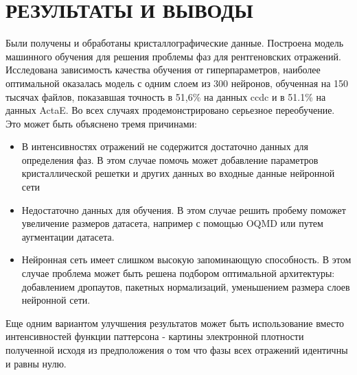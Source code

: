\documentclass{article}
\begin{document}





\newpage
\section{РЕЗУЛЬТАТЫ И ВЫВОДЫ}

Были получены и обработаны кристаллографические данные. Построена модель машинного обучения для решения проблемы фаз для рентгеновских отражений. Исследована зависимость качества обучения от гиперпараметров, наиболее оптимальной оказалась модель с одним слоем из 300 нейронов, обученная на 150 тысячах файлов, показавшая точность в 51,6\% на данных ccdc и в 51.1\% на данных ActaE. Во всех случаях продемонстрировано серьезное переобучение. Это может быть объяснено тремя причинами:
\begin{itemize}
\item В интенсивностях отражений не содержится достаточно данных для определения фаз. В этом случае помочь может добавление параметров кристаллической решетки и других данных во входные данные нейронной сети
\item Недостаточно данных для обучения. В этом случае решить пробему поможет увеличение размеров датасета, например с помощью OQMD или путем аугментации датасета.
\item Нейронная сеть имеет слишком высокую запоминающую способность. В этом случае проблема может быть решена подбором оптимальной архитектуры: добавлением дропаутов, пакетных нормализаций, уменьшением размера слоев нейронной сети.
\end{itemize}
Еще одним вариантом улучшения результатов может быть использование вместо интенсивностей функции паттерсона\cite{PattersonMethod} - картины электронной плотности полученной исходя из предположения о том что фазы всех отражений идентичны и равны нулю. 
\newpage
\printbibliography
\end{document}
